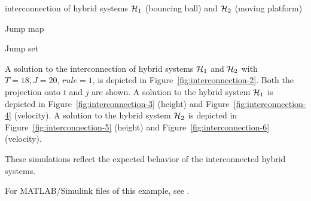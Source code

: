 \begin{example}{interconnection of hybrid systems $\mathcal{H}_1$ (bouncing ball) and $\mathcal{H}_2$ (moving platform)}
\begin{itemize}
Jump map
\label{scr:g2}

Jump set
\label{scr:D2}

\end{itemize}

A solution to the interconnection of hybrid systems $\mathcal{H}_1$ and
$\mathcal{H}_2$ with $T=18, J=20$, $rule =1$, is depicted in Figure~\ref{fig:interconnection-2}.
Both the projection onto $t$ and $j$ are shown. A solution to the hybrid system $\mathcal{H}_1$ is
depicted in Figure~\ref{fig:interconnection-3} (height) and Figure~\ref{fig:interconnection-4}
(velocity). A solution to the hybrid system $\mathcal{H}_2$ is depicted in
Figure~\ref{fig:interconnection-5} (height) and Figure~\ref{fig:interconnection-6} (velocity).

These simulations reflect the expected behavior of the interconnected hybrid systems. %

For MATLAB/Simulink files of this example, see .

\end{example}

